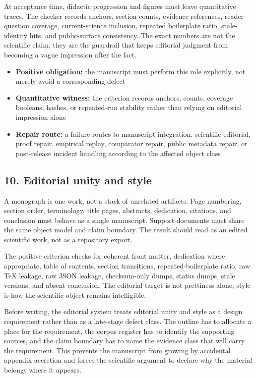 At acceptance time, didactic progression and figures must leave quantitative traces. The checker records anchors, section counts, evidence references, reader-question coverage, current-science inclusion, repeated boilerplate ratio, stale-identity hits, and public-surface consistency. The exact numbers are not the scientific claim; they are the guardrail that keeps editorial judgment from becoming a vague impression after the fact.


\begin{itemize}[leftmargin=1.8em]

\item \textbf{Positive obligation:} the manuscript must perform this role explicitly, not merely avoid a corresponding defect

\item \textbf{Quantitative witness:} the criterion records anchors, counts, coverage booleans, hashes, or repeated-run stability rather than relying on editorial impression alone

\item \textbf{Repair route:} a failure routes to manuscript integration, scientific editorial, proof repair, empirical replay, comparator repair, public metadata repair, or post-release incident handling according to the affected object class

\end{itemize}

\subsection{10. Editorial unity and style}

A monograph is one work, not a stack of unrelated artifacts. Page numbering, section order, terminology, title pages, abstracts, dedication, citations, and conclusion must behave as a single manuscript. Support documents must share the same object model and claim boundary. The result should read as an edited scientific work, not as a repository export.


The positive criterion checks for coherent front matter, dedication where appropriate, table of contents, section transitions, repeated-boilerplate ratio, raw TeX leakage, raw JSON leakage, checksum-only dumps, status dumps, stale versions, and absent conclusion. The editorial target is not prettiness alone; style is how the scientific object remains intelligible.


Before writing, the editorial system treats editorial unity and style as a design requirement rather than as a late-stage defect class. The outline has to allocate a place for the requirement, the corpus register has to identify the supporting sources, and the claim boundary has to name the evidence class that will carry the requirement. This prevents the manuscript from growing by accidental appendix accretion and forces the scientific argument to declare why the material belongs where it appears.


